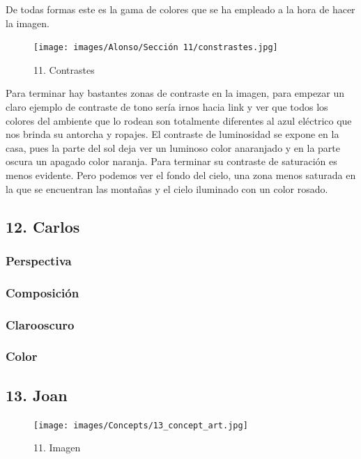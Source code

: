\documentclass[12pt]{article}
\begin{document}
    De todas formas este es la gama de colores que se ha empleado a la hora de hacer la imagen.

\begin{figure}[H]
      \centering
      \texttt{[image: images/Alonso/Sección 11/constrastes.jpg]}
      \caption{\small 11. Contrastes}
    \end{figure}
    Para terminar hay bastantes zonas de contraste en la imagen, para empezar un claro ejemplo de contraste de tono sería irnos hacia link y ver que todos los colores del ambiente que lo rodean son totalmente diferentes al azul eléctrico que nos brinda su antorcha y ropajes. El contraste de luminosidad se expone en la casa, pues la parte del sol deja ver un luminoso color anaranjado y en la parte oscura un apagado color naranja. Para terminar su contraste de saturación es menos evidente. Pero podemos ver el fondo del cielo, una zona menos saturada en la que se encuentran las montañas y el cielo iluminado con un color rosado.
        \newpage


    \subsection{12. Carlos}
        \subsubsection{Perspectiva}

        \subsubsection{Composición}

        \subsubsection{Clarooscuro}

        \subsubsection{Color}
        \newpage


    \subsection{13. Joan}
        \begin{figure}[H]
          \centering
          \texttt{[image: images/Concepts/13\_concept\_art.jpg]}
          \caption{\small 11. Imagen}
        \end{figure}
\end{document}
